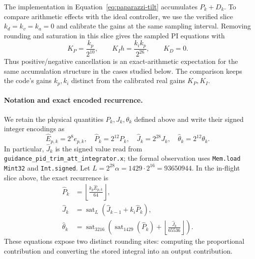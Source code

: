 \documentclass[manuscript, screen, review]{acmart}
\begin{document}
The implementation in Equation~\eqref{eq:paparazzi-tilt} accumulates
$P_k+D_k$. To compare arithmetic effects with the ideal controller, we
use the verified slice $k_d=k_v=k_a=0$ and calibrate the gains at the
same sampling interval. Removing rounding and saturation in this slice
gives the sampled PI equations with
\begin{equation}
 K_P=\frac{k_p}{2^{10}},\qquad
 K_I h=\frac{k_i k_p}{2^{26}},\qquad K_D=0.
 \label{eq:pid-ideal-gain-map}
\end{equation}
Thus positive/negative cancellation is an exact-arithmetic expectation
for the same accumulation structure in the cases studied below.
The comparison keeps the code's gains $k_p,k_i$ distinct from the
calibrated real gains $K_P,K_I$.

\paragraph{Notation and exact encoded recurrence.}
We retain the physical quantities $P_k,J_k,\theta_k$ defined above and
write their signed integer encodings as
\begin{equation}
 \widehat E_{p,k}=2^8e_{p,k},\quad
 \widehat P_k=2^{12}P_k,\quad
 \widehat J_k=2^{28}J_k,\quad
 \widehat\theta_k=2^{12}\theta_k .
 \label{eq:pid-encoding-map}
\end{equation}
In particular, $\widehat J_k$ is the signed value read from
\texttt{guidance\_\allowbreak pid\_\allowbreak trim\_\allowbreak att\_\allowbreak integrator.x};
the formal observation uses \texttt{Mem.load Mint32} and
\texttt{Int.signed}. Let
$L=2^{28}\alpha=1429\cdot2^{16}=93650944$.
In the in-flight slice above, the exact recurrence is
\begin{align}
 \widehat P_k
   &=\left\lfloor\frac{k_p\widehat E_{p,k}}{64}\right\rfloor,\label{eq:pid-code-p}\\
 \widehat J_k
   &=\operatorname{sat}_L\!\left(\widehat J_{k-1}+k_i\widehat P_k\right),
       \label{eq:pid-code-integral}\\
 \widehat\theta_k
   &=\operatorname{sat}_{3216}\!\left(
       \operatorname{sat}_{1429}(\widehat P_k)
       +\left\lfloor\frac{\widehat J_k}{65536}\right\rfloor\right).
       \label{eq:pid-code-output}
\end{align}
These equations expose two distinct rounding sites: computing the
proportional contribution and converting the stored integral into an
output contribution.
\end{document}
